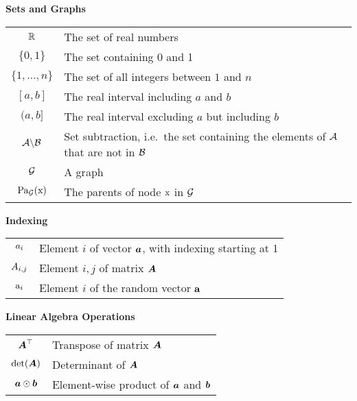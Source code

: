 \vspace{\notationgap}
\begin{minipage}{\textwidth}
	\centerline{\bf Sets and Graphs}
	\bgroup
	\def\arraystretch{1.5}
	\begin{tabular}{cp{3.25in}}
		$\displaystyle \mathbb{R}$ & The set of real numbers \\
		$\displaystyle \{0, 1\}$ & The set containing 0 and 1 \\
		$\displaystyle \{1, \dots, n \}$ & The set of all integers between $1$ and $n$\\
		$\displaystyle [a, b]$ & The real interval including $a$ and $b$\\
		$\displaystyle (a, b]$ & The real interval excluding $a$ but including $b$\\
		$\displaystyle {\mathcal{A}} \backslash {\mathcal{B}}$ & Set subtraction, i.e.\ the set containing the elements of ${\mathcal{A}}$ that are not in ${\mathcal{B}}$\\
		$\displaystyle {\mathcal{G}}$ & A graph\\
		$\displaystyle \mathrm{Pa}_{\mathcal{G}}({\textnormal{x}})$ & The parents of node ${\textnormal{x}}$ in ${\mathcal{G}}$
	\end{tabular}
	\egroup
\end{minipage}

\vspace{\notationgap}
\begin{minipage}{\textwidth}
	\centerline{\bf Indexing}
	\bgroup
	\def\arraystretch{1.5}
	\begin{tabular}{cp{3.25in}}
		$\displaystyle {a}_i$ & Element $i$ of vector ${\bm{a}}$, with indexing starting at 1 \\
		$\displaystyle {A}_{i,j}$ & Element $i, j$ of matrix ${\bm{A}}$ \\
		$\displaystyle {\textnormal{a}}_i$ & Element $i$ of the random vector ${\mathbf{a}}$ \\
	\end{tabular}
	\egroup
\end{minipage}

\vspace{\notationgap}
\begin{minipage}{\textwidth}
	\centerline{\bf Linear Algebra Operations}
	\bgroup
	\def\arraystretch{1.5}
	\begin{tabular}{cp{3.25in}}
		$\displaystyle {\bm{A}} ^\top$ & Transpose of matrix ${\bm{A}}$ \\
		$\displaystyle \mathrm{det}({\bm{A}})$ & Determinant of ${\bm{A}}$ \\
        $\displaystyle {\bm{a}} \odot {\bm{b}} $ & Element-wise product of ${\bm{a}}$ and ${\bm{b}}$ \\
	\end{tabular}
	\egroup
\end{minipage}

